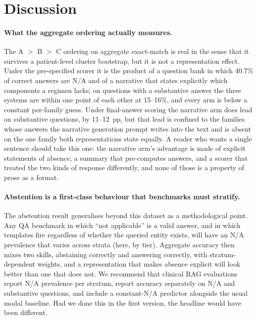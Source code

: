 
\section{Discussion}
\label{sec:discussion}

\paragraph{What the aggregate ordering actually measures.}
The A $>$ B $>$ C ordering on aggregate exact-match is real in the sense that it survives
a patient-level cluster bootstrap, but it is not a representation effect.  Under the
pre-specified scorer it is the product of a question bank in which 40.7\% of correct
answers are N/A and of a narrative that states explicitly which components a regimen
lacks; on questions with a substantive answer the three systems are within one point of
each other at 15--16\%, and every arm is below a constant per-family guess.  Under
final-answer scoring the narrative arm does lead on substantive questions, by 11--12~pp,
but that lead is confined to the families whose answers the narrative generation prompt
writes into the text and is absent on the one family both representations state equally.
A reader who wants a single sentence should take this one: the narrative arm's advantage
is made of explicit statements of absence, a summary that pre-computes answers, and a
scorer that treated the two kinds of response differently, and none of those is a
property of prose as a format.

\paragraph{Abstention is a first-class behaviour that benchmarks must stratify.}
The abstention result generalises beyond this dataset as a methodological point.  Any QA
benchmark in which ``not applicable'' is a valid answer, and in which templates fire
regardless of whether the queried entity exists, will have an N/A prevalence that varies
across strata (here, by tier).  Aggregate accuracy then mixes two skills, abstaining
correctly and answering correctly, with stratum-dependent weights, and a representation
that makes absence explicit will look better than one that does not.  We recommend that
clinical RAG evaluations report N/A prevalence per stratum, report accuracy separately on
N/A and substantive questions, and include a constant-N/A predictor alongside the usual
modal baseline.  Had we done this in the first version, the headline would have been
different.


